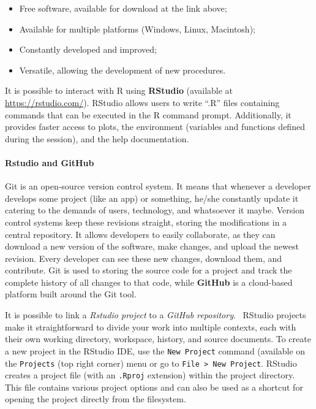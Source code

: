 \documentclass[
]{article}
\providecommand{\tightlist}{%
  \setlength{\itemsep}{0pt}\setlength{\parskip}{0pt}}
\begin{document}
\begin{itemize}
\tightlist
\item
  Free software, available for download at the link above;
\item
  Available for multiple platforms (Windows, Linux, Macintosh);
\item
  Constantly developed and improved;
\item
  Versatile, allowing the development of new procedures.
\end{itemize}

It is possible to interact with R using \textbf{RStudio} (available at
\url{https://rstudio.com/}). RStudio allows users to write ``.R'' files
containing commands that can be executed in the R command prompt.
Additionally, it provides faster access to plots, the environment
(variables and functions defined during the session), and the help
documentation.

\hypertarget{rstudio-and-github}{%
\paragraph{Rstudio and GitHub}\label{rstudio-and-github}}

Git is an open-source version control system. It means that whenever a
developer develops some project (like an app) or something, he/she
constantly update it catering to the demands of users, technology, and
whatsoever it maybe. Version control systems keep these revisions
straight, storing the modifications in a central repository. It allows
developers to easily collaborate, as they can download a new version of
the software, make changes, and upload the newest revision. Every
developer can see these new changes, download them, and contribute. Git
is used to storing the source code for a project and track the complete
history of all changes to that code, while \textbf{GitHub} is a
cloud-based platform built around the Git tool.

It is possible to link a \emph{Rstudio project} to a \emph{GitHub
repository}. ~RStudio projects make it straightforward to divide your
work into multiple contexts, each with their own working directory,
workspace, history, and source documents. To create a new project in the
RStudio IDE, use the \texttt{New\ Project} command (available on the
\texttt{Projects} (top right corner) menu or go to
\texttt{File\ \textgreater{}\ New\ Project}. RStudio creates a project
file (with an \texttt{.Rproj} extension) within the project directory.
This file contains various project options and can also be used as a
shortcut for opening the project directly from the filesystem.
\end{document}
